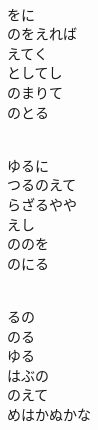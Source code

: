 \documentclass[10pt,b5j]{tarticle} %
\begin{document}
\vspace{1.5em} %
\newcommand{\linespace}{0.5em} %
\newcommand{\blocksize}{0.5\hsize} %
\newcommand{\itemmargin}{3em} %
\begin{enumerate} %
    \setlength{\itemindent}{\itemmargin} %
    \begin{minipage}[c]{\blocksize}
    
        \vspace{\linespace}
        \item~\\
        をに\\
        のをえれば\\
        えてく\\
        としてし\\
        のまりて\\
        のとる
        
    \end{minipage}
    \begin{minipage}[c]{\blocksize}
        
        \vspace{\linespace}
        \item~\\
        ゆるに\\
        つるのえて\\
        らざるやや\\
        えし\\
        ののを\\
        のにる
        
    \end{minipage}
    \begin{minipage}[c]{\blocksize}
        
        \vspace{\linespace}
        \item~\\
        るの\\
        のる\\
        ゆる\\
        はぶの\\
        のえて\\
        めはかぬかな
        

\end{minipage}
\end{enumerate}
\end{document}
